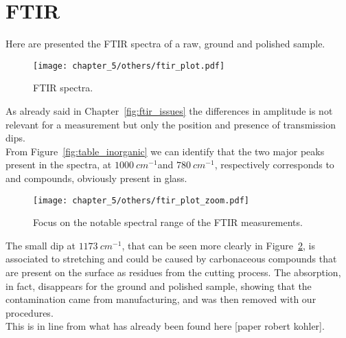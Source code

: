 \label{ch:experimental_results}

\section{FTIR}
\label{sec:ftir_results}
Here are presented the FTIR spectra of a raw, ground and polished sample. 

\begin{figure}[H]
    \centering
    \texttt{[image: chapter\_5/others/ftir\_plot.pdf]} 
    \vspace*{-30pt}
    \caption{FTIR spectra.}
    \label{fig:ftir_plot}
 \end{figure}
 As already said in Chapter~\ref{fig:ftir_issues} the differences in amplitude is not relevant for a measurement but only the position and presence of transmission dips. 
\\
From Figure~\ref{fig:table_inorganic} we can identify that the two major peaks present in the spectra, at $1000 \:cm^{-1} $and $780 \:cm^{-1}$, respectively corresponds to  and  compounds, obviously present in glass.
\\
\begin{figure}[H]
    \centering
    \texttt{[image: chapter\_5/others/ftir\_plot\_zoom.pdf]} 
    \vspace*{-30pt}
    \caption{Focus on the notable spectral range of the FTIR measurements.}
    \label{fig:ftir_zoom_plot}
 \end{figure}

The small dip at $1173 \:cm^{-1}$, that can be seen more clearly in Figure~\ref{fig:ftir_zoom_plot}, is associated to  stretching and could be caused by carbonaceous compounds that are present on the surface as residues from the cutting process. The absorption, in fact, disappears for the ground and polished sample, showing that the contamination came from manufacturing, and was then removed with our procedures.
\\
This is in line from what has already been found here [paper robert kohler].

